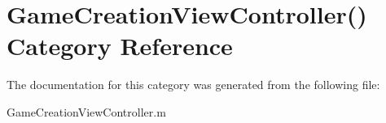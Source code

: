\hypertarget{category_game_creation_view_controller_07_08}{\section{Game\+Creation\+View\+Controller() Category Reference}
\label{category_game_creation_view_controller_07_08}
}


The documentation for this category was generated from the following file\+:\begin{DoxyCompactItemize}
\item 
Game\+Creation\+View\+Controller.\+m\end{DoxyCompactItemize}
